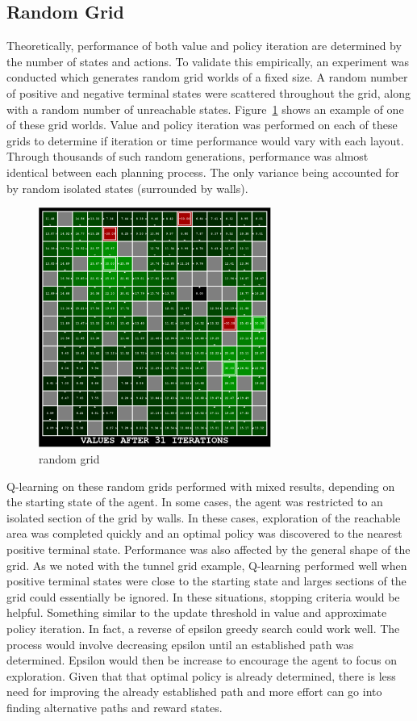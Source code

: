 \documentclass{sig-alternate}
\begin{document}
\subsection{Random Grid}

Theoretically, performance of both value and policy iteration are determined by the number of states and actions. To validate this empirically, an experiment was conducted which generates random grid worlds of a fixed size. A random number of positive and negative terminal states were scattered throughout the grid, along with a random number of unreachable states. Figure~\ref{random} shows an example of one of these grid worlds. Value and policy iteration was performed on each of these grids to determine if iteration or time performance would vary with each layout. Through thousands of such random generations, performance was almost identical between each planning process. The only variance being accounted for by random isolated states (surrounded by walls).

\begin{figure}[!htbp]
    \centering
    \includegraphics[width=3in]{images/random.pdf}
    \caption{random grid \label{random}}
\end{figure} 

Q-learning on these random grids performed with mixed results, depending on the starting state of the agent. In some cases, the agent was restricted to an isolated section of the grid by walls. In these cases, exploration of the reachable area was completed quickly and an optimal policy was discovered to the nearest positive terminal state. Performance was also affected by the general shape of the grid. As we noted with the tunnel grid example, Q-learning performed well when positive terminal states were close to the starting state and larges sections of the grid could essentially be ignored. In these situations, stopping criteria would be helpful. Something similar to the update threshold in value and approximate policy iteration. In fact, a reverse of epsilon greedy search could work well. The process would involve decreasing epsilon until an established path was determined. Epsilon would then be increase to encourage the agent to focus on exploration. Given that that optimal policy is already determined, there is less need for improving the already established path and more effort can go into finding alternative paths and reward states.
\end{document}
